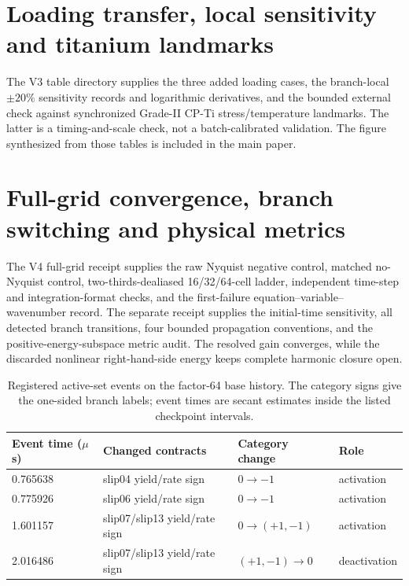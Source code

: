 \documentclass[preprint,12pt]{elsarticle}
\begin{document}

\section{Loading transfer, local sensitivity and titanium landmarks}

The V3 table directory supplies the three added loading cases, the
branch-local $\pm20\%$ sensitivity records and logarithmic derivatives, and
the bounded external check against synchronized Grade-II CP-Ti
stress/temperature landmarks.  The latter is a timing-and-scale check, not a
batch-calibrated validation.  The figure synthesized from those tables is
included in the main paper.

\section{Full-grid convergence, branch switching and physical metrics}

The V4 full-grid receipt
 supplies the
raw Nyquist negative control, matched no-Nyquist control, two-thirds-dealiased
16/32/64-cell ladder, independent time-step and integration-format checks,
and the first-failure equation--variable--wavenumber record.  The separate
receipt  supplies
the initial-time sensitivity, all detected branch transitions, four bounded
propagation conventions, and the positive-energy-subspace metric audit.  The
resolved gain converges, while the discarded nonlinear right-hand-side energy
keeps complete harmonic closure open.

\begin{table}[ht]
\centering
\caption{Registered active-set events on the factor-64 base history.  The
category signs give the one-sided branch labels; event times are secant
estimates inside the listed checkpoint intervals.}
\small
\begin{tabular}{@{}llll@{}}
\toprule
Event time ($\mu$s) & Changed contracts & Category change & Role \\
\midrule
0.765638 & slip04 yield/rate sign & $0\rightarrow-1$ & activation \\
0.775926 & slip06 yield/rate sign & $0\rightarrow-1$ & activation \\
1.601157 & slip07/slip13 yield/rate sign & $0\rightarrow(+1,-1)$ & activation \\
2.016486 & slip07/slip13 yield/rate sign & $(+1,-1)\rightarrow0$ & deactivation \\
\bottomrule
\end{tabular}
\end{table}
\end{document}
